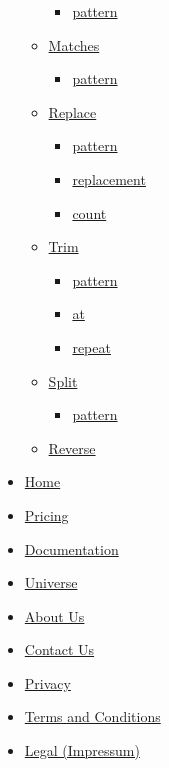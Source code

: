 \begin{itemize}
\begin{itemize}
    \begin{itemize}
    \tightlist
    \item
      \hyperref[definitions-match-pattern]{pattern}
    \end{itemize}
  \item
    \hyperref[definitions-matches]{Matches}

    \begin{itemize}
    \tightlist
    \item
      \hyperref[definitions-matches-pattern]{pattern}
    \end{itemize}
  \item
    \hyperref[definitions-replace]{Replace}

    \begin{itemize}
    \tightlist
    \item
      \hyperref[definitions-replace-pattern]{pattern}
    \item
      \hyperref[definitions-replace-replacement]{replacement}
    \item
      \hyperref[definitions-replace-count]{count}
    \end{itemize}
  \item
    \hyperref[definitions-trim]{Trim}

    \begin{itemize}
    \tightlist
    \item
      \hyperref[definitions-trim-pattern]{pattern}
    \item
      \hyperref[definitions-trim-at]{at}
    \item
      \hyperref[definitions-trim-repeat]{repeat}
    \end{itemize}
  \item
    \hyperref[definitions-split]{Split}

    \begin{itemize}
    \tightlist
    \item
      \hyperref[definitions-split-pattern]{pattern}
    \end{itemize}
  \item
    \hyperref[definitions-rev]{Reverse}
  \end{itemize}
\end{itemize}

\begin{itemize}
\tightlist
\item
  \href{/}{Home}
\item
  \href{/pricing/}{Pricing}
\item
  \href{/docs/}{Documentation}
\item
  \href{/universe/}{Universe}
\item
  \href{/about/}{About Us}
\item
  \href{/contact/}{Contact Us}
\item
  \href{/privacy/}{Privacy}
\item
  \href{https://typst.app/terms}{Terms and Conditions}
\item
  \href{/legal/}{Legal (Impressum)}
\end{itemize}

